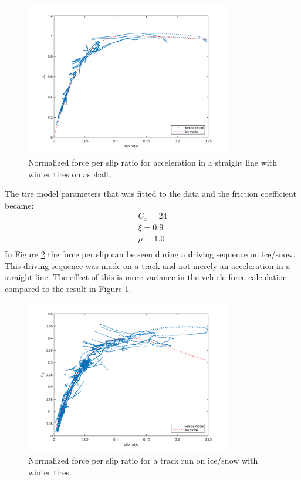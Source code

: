 \begin{figure}[h]
	\centering
	\includegraphics[width=0.8\textwidth]{Pictures/slip_kraft_ljungby}
	\caption {Normalized force per slip ratio for acceleration in a straight line with winter tires on asphalt.}
	\label{slip_kraft_ljungby}
\end{figure}

The tire model parameters that was fitted to the data and the friction coefficient became:
\begin{equation}
\label{winter_asphalt}
\begin{split}
C_{x} = 24 \\
\xi = 0.9 \\
\mu = 1.0 \\
\end{split}
\end{equation}
In Figure \ref{slip_kraft_is} the force per slip can be seen during a driving sequence on ice/snow. This driving sequence was made on a track and not merely an acceleration in a straight line. The effect of this is more variance in the vehicle force calculation compared to the result in Figure \ref{slip_kraft_ljungby}. 

\begin{figure}[h]
	\centering
	\includegraphics[width=0.8\textwidth]{Pictures/slip_kraft_is}
	\caption {Normalized force per slip ratio for a track run on ice/snow with winter tires.}
	\label{slip_kraft_is}
\end{figure}

